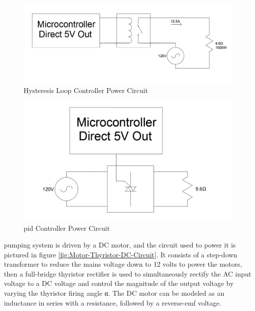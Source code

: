 \documentclass{article}
\begin{document}
\begin{figure}[H]
\begin{center}
\includegraphics[scale=0.20]{heater-hysteresis-circuit.png}
\caption{Hysteresis Loop Controller Power Circuit}
\label{fig:heater-hysteresis-circuit}
\end{center}
\end{figure}

\begin{figure}[H]
\begin{center}
\includegraphics[scale=0.20]{heater-pid-circuit.png}
\caption{\gls{pid} Controller Power Circuit}
\label{fig:heater-pid-circuit}
\end{center}
\end{figure}

 pumping system is driven by a DC motor, and the circuit used to power it is pictured in figure \ref{fig:Motor-Thyristor-DC-Circuit}. It consists of a step-down transformer to reduce the mains voltage down to 12 volts to power the motors, then a full-bridge thyristor rectifier is used to simultaneously rectify the AC input voltage to a DC voltage and control the magnitude of the output voltage by varying the thyristor firing angle α. The DC motor can be modeled as an inductance in series with a resistance, followed by a reverse-emf voltage.
\end{document}
